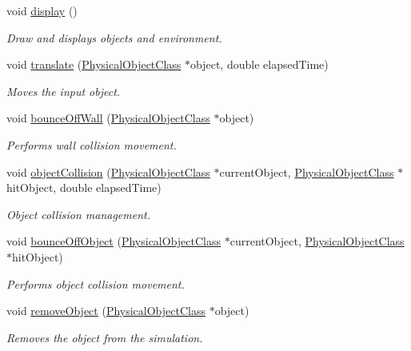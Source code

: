 \begin{DoxyCompactItemize}
void \hyperlink{classEnvironmentClass_a862919dd05c8ec626360f11b809bd6ae}{display} ()
\begin{DoxyCompactList}\small\item\em Draw and displays objects and environment. \end{DoxyCompactList}\item 
void \hyperlink{classEnvironmentClass_a0fa52a8dd735412f9d46f4e2499e8108}{translate} (\hyperlink{classPhysicalObjectClass}{Physical\-Object\-Class} $\ast$object, double elapsed\-Time)
\begin{DoxyCompactList}\small\item\em Moves the input object. \end{DoxyCompactList}\item 
void \hyperlink{classEnvironmentClass_a2073fafc0218848ea81d21138ea702b7}{bounce\-Off\-Wall} (\hyperlink{classPhysicalObjectClass}{Physical\-Object\-Class} $\ast$object)
\begin{DoxyCompactList}\small\item\em Performs wall collision movement. \end{DoxyCompactList}\item 
void \hyperlink{classEnvironmentClass_a6ce1e78294fb94ac1fc27cf3ef1f0419}{object\-Collision} (\hyperlink{classPhysicalObjectClass}{Physical\-Object\-Class} $\ast$current\-Object, \hyperlink{classPhysicalObjectClass}{Physical\-Object\-Class} $\ast$hit\-Object, double elapsed\-Time)
\begin{DoxyCompactList}\small\item\em Object collision management. \end{DoxyCompactList}\item 
void \hyperlink{classEnvironmentClass_aa57351175592327c191e0d84ef2be6e3}{bounce\-Off\-Object} (\hyperlink{classPhysicalObjectClass}{Physical\-Object\-Class} $\ast$current\-Object, \hyperlink{classPhysicalObjectClass}{Physical\-Object\-Class} $\ast$hit\-Object)
\begin{DoxyCompactList}\small\item\em Performs object collision movement. \end{DoxyCompactList}\item 
void \hyperlink{classEnvironmentClass_a564160db6ba48653b24b3a42ce9d2d58}{remove\-Object} (\hyperlink{classPhysicalObjectClass}{Physical\-Object\-Class} $\ast$object)
\begin{DoxyCompactList}\small\item\em Removes the object from the simulation. \end{DoxyCompactList}\end{DoxyCompactItemize}
